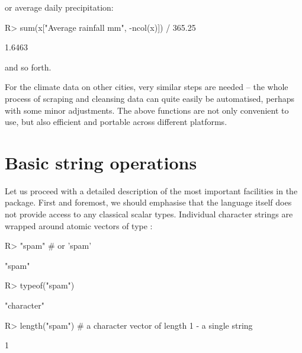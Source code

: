 \documentclass[nojss]{jss}
\begin{document}
\noindent
or average daily precipitation:

\begin{Schunk}
\begin{Sinput}
R> sum(x["Average rainfall mm", -ncol(x)]) / 365.25
\end{Sinput}
\begin{Soutput}
[1] 1.6463
\end{Soutput}
\end{Schunk}

\noindent
and so forth.

For the climate data on other cities, very similar steps are
needed -- the whole process of scraping and cleansing data
can quite easily be automatised, perhaps with some minor adjustments.
The above functions are not only convenient to use, but also efficient
and portable across different platforms.




\section{Basic string operations}\label{Sec:basic}

Let us proceed with a detailed description of the most important
facilities in the  package.
First and foremost, we should emphasise that the   language
itself does not provide access to any classical scalar types.
Individual character strings are  wrapped around atomic vectors
of type :

\begin{Schunk}
\begin{Sinput}
R> "spam"          # or 'spam'
\end{Sinput}
\begin{Soutput}
[1] "spam"
\end{Soutput}
\begin{Sinput}
R> typeof("spam")
\end{Sinput}
\begin{Soutput}
[1] "character"
\end{Soutput}
\begin{Sinput}
R> length("spam")  # a character vector of length 1 - a single string
\end{Sinput}
\begin{Soutput}
[1] 1
\end{Soutput}
\end{Schunk}
\end{document}
